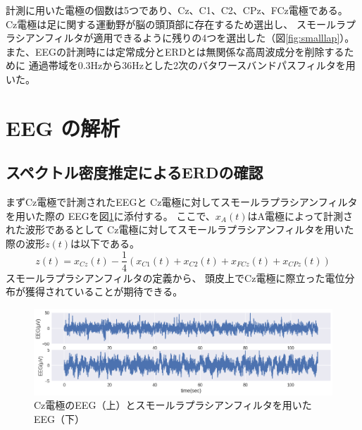 計測に用いた電極の個数は5つであり、Cz、C1、C2、CPz、FCz電極である。
Cz電極は足に関する運動野が脳の頭頂部に存在するため選出し、
スモールラプラシアンフィルタが適用できるように残りの4つを選出した（図\ref{fig:smalllap}）。
また、EEGの計測時には定常成分とERDとは無関係な高周波成分を削除するために
通過帯域を0.3Hzから36Hzとした2次のバタワースバンドパスフィルタを用いた。

\section{\rm EEG \mc の解析}
\subsection{\mc スペクトル密度推定による\rm ERD\mc の確認}
まずCz電極で計測されたEEGと
Cz電極に対してスモールラプラシアンフィルタを用いた際の
EEGを図\ref{fig:eegsub1}に添付する。
ここで、\(x_{A}(t)\)はA電極によって計測された波形であるとして
Cz電極に対してスモールラプラシアンフィルタを用いた際の波形\(z(t)\)は以下である。
\begin{equation}
    z(t) = x_{Cz}(t) - \frac{1}{4}(x_{C1}(t) + x_{C2}(t) + x_{FCz}(t) + x_{CPz}(t))
\end{equation}
スモールラプラシアンフィルタの定義から、
頭皮上でCz電極に際立った電位分布が獲得されていることが期待できる。

\begin{figure}
    \centering
    \includegraphics[width=13cm]{images/eeg_sub1.png}
    \caption{Cz電極のEEG（上）とスモールラプラシアンフィルタを用いたEEG（下）}
    \label{fig:eegsub1}
\end{figure}


